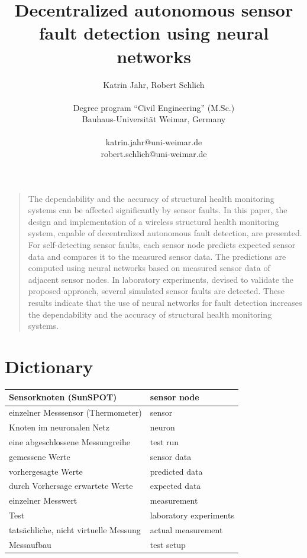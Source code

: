 \documentclass[12pt,a4paper]{scrartcl}
\title{\textbf{ \Large{Decentralized autonomous sensor fault detection using neural networks}} }
\author
{Katrin Jahr, Robert Schlich\\
\\
\normalsize{Degree program “Civil Engineering” (M.Sc.)}\\
\normalsize{Bauhaus-Universität Weimar, Germany}\\
\\
\normalsize{katrin.jahr@uni-weimar.de}\\
\normalsize{robert.schlich@uni-weimar.de}
}
\date{}
\newenvironment{sciabstract}{%
\begin{quote} \bfseries}
{\end{quote}}
\begin{document}
 


\baselineskip36pt


\maketitle 




\begin{sciabstract}

The dependability and the accuracy of structural health monitoring systems can be affected significantly by sensor faults. 
In this paper, the design and implementation of a wireless structural health monitoring system, capable of decentralized autonomous fault detection, are presented. 
For self-detecting sensor faults, each sensor node predicts expected sensor data and compares it to the measured sensor data. 
The predictions are computed using neural networks based on measured sensor data of adjacent sensor nodes.
In laboratory experiments, devised to validate the proposed approach, several simulated sensor faults are detected.
These results indicate that the use of neural networks for fault detection increases the dependability and the accuracy of structural health monitoring systems.

\end{sciabstract}


\section*{Dictionary}

\begin{tabular}{|l|l|}
\hline 
Sensorknoten (SunSPOT) & sensor node \\ 
\hline 
einzelner Messsensor (Thermometer) & sensor \\ 
\hline 
Knoten im neuronalen Netz & neuron \\ 
\hline 
eine abgeschlossene Messungreihe & test run \\ 
\hline 
gemessene Werte & sensor data \\ 
\hline 
vorhergesagte Werte & predicted data \\ 
\hline 
durch Vorhersage erwartete Werte & expected data \\ 
\hline 
einzelner Messwert & measurement \\ 
\hline 
Test & laboratory experiments\\ 
\hline
tatsächliche, nicht virtuelle Messung & actual measurement \\
\hline
Messaufbau & test setup \\
\hline

\end{tabular} 
\end{document}
